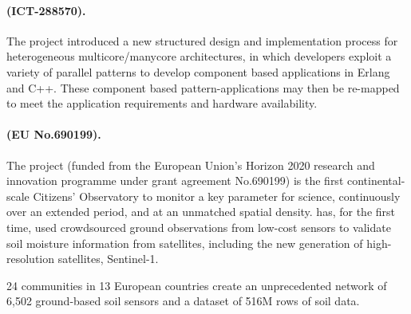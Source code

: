 \documentclass[a4paper,11pt]{article}
\newcommand{\project}[1]{\textbf{#1}\xspace}
\newcommand{\SECURITY}{\project{Elysian}}
\newcommand{\TheProject}{\SECURITY}
\begin{document}



\begin{mdframed}[backgroundcolor=blue!5]
\paragraph{\paraphrase (ICT-288570).}
The \paraphrase project introduced a new structured design and implementation process for
heterogeneous multicore/manycore architectures, in which developers exploit a variety of
parallel patterns to develop component based applications in Erlang and C++. These
component based pattern-applications may then be re-mapped to meet the
application requirements and hardware availability. 
\end{mdframed}

\begin{mdframed}[backgroundcolor=blue!5]
\paragraph{\grow (EU No.690199).}
The \grow project (funded from the European Union’s Horizon 2020 research and innovation programme under grant agreement No.690199) is the first continental-scale Citizens’ Observatory to monitor a key parameter for science, continuously over an extended period, and at an unmatched spatial density. \grow has, for the first time, used crowdsourced ground observations from low-cost sensors to validate soil moisture information from satellites, including the new generation of high-resolution satellites, Sentinel-1.

24 \grow communities in 13 European countries create an unprecedented network of 6,502 ground-based soil sensors and a dataset of 516M rows of soil data. 
\end{mdframed}
\end{document}
